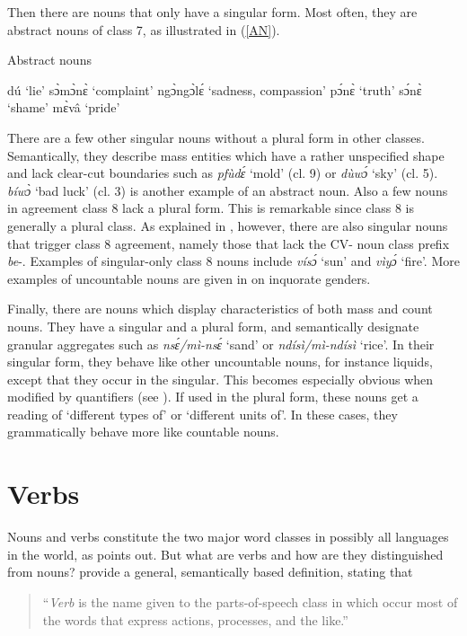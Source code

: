 Then there are nouns that only have a singular form. Most often, they are abstract nouns of class 7, as illustrated in (\ref{AN}).

\begin{exe}
\ex\label{AN} Abstract nouns
\begin{xlist}
\ex dú `lie' 
\ex sɔ̀mɔ̀nɛ̀ `complaint'
\ex ngɔ̀ngɔ̀lɛ́ `sadness, compassion'
\ex pɔ́nɛ̀ `truth'
\ex sɔ́nɛ̀ `shame'
\ex mɛ̀vâ `pride'
\end{xlist}
\end{exe}

There are a few other singular nouns without a plural form in other classes. Semantically, they describe mass entities which have a rather unspecified shape and lack clear-cut boundaries such as {\itshape pfùdɛ́} `mold' (cl. 9) or {\itshape dùwɔ́} `sky' (cl. 5). {\itshape bíwɔ̀} `bad luck' (cl. 3) is another example of an abstract noun. 
Also a few nouns in agreement class 8 lack a plural form. This is remarkable since class 8 is generally a plural class. As explained in , however, there are also singular nouns that trigger class 8 agreement, namely those that lack the CV- noun class prefix {\itshape be}-.  Examples of singular-only class 8 nouns include {\itshape vísɔ́} `sun' and {\itshape vìyɔ́} `fire'.  More examples of uncountable nouns are given in  on inquorate genders.

Finally, there are nouns which display characteristics of both mass and count nouns. They have a singular and a plural form, and semantically designate granular aggregates such as {\itshape nsɛ́/mì-nsɛ́} `sand' or {\itshape ndísì/mì-ndísì} `rice'. In their singular form, they behave like other uncountable nouns, for instance liquids, except that they occur in the singular. This becomes especially obvious when modified by quantifiers (see ). If used in the plural form, these  nouns get a reading of `different types of' or `different units of'. In these cases, they grammatically behave more like countable nouns.









\section{Verbs}
\label{sec:V}



Nouns and verbs constitute the two major word classes in possibly all languages in the world, as \citet[408]{viberg2006} points out. But what are verbs and how are they distinguished from nouns? \citet[9]{schachter2007} provide a general, semantically based definition, stating that
\begin{quote}
``{\itshape Verb} is the name given to the parts-of-speech class in which occur most of the words that express actions, processes, and the like.''
\end{quote}

